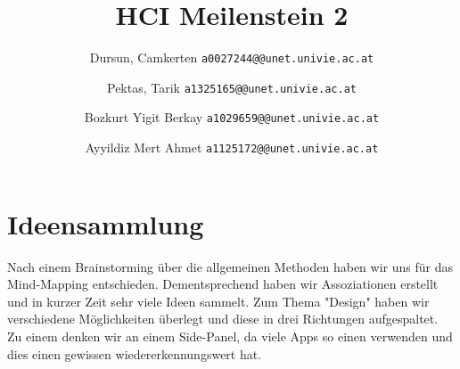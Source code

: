\documentclass[runningheads,a4paper]{llncs}
\begin{document}
\mainmatter  %

\title{HCI Meilenstein 2}


\author{
  Dursun, Camkerten
  \texttt{a0027244@@unet.univie.ac.at}
  \and
  Pektas, Tarik
  \texttt{a1325165@@unet.univie.ac.at}
  \and
  Bozkurt Yigit Berkay
  \texttt{a1029659@@unet.univie.ac.at}
  \and
  Ayyildiz Mert Ahmet
  \texttt{a1125172@@unet.univie.ac.at}
}



\maketitle

\section{Ideensammlung}
Nach einem Brainstorming über die allgemeinen Methoden haben wir uns für das Mind-Mapping entschieden. Dementsprechend haben wir Assoziationen erstellt und in kurzer Zeit sehr viele Ideen sammelt. Zum Thema "Design" haben wir verschiedene Möglichkeiten überlegt und diese in drei Richtungen aufgespaltet. 
Zu einem denken wir an einem Side-Panel, da viele Apps so einen verwenden und dies einen gewissen wiedererkennungswert hat.  \\\\ 
\end{document}
